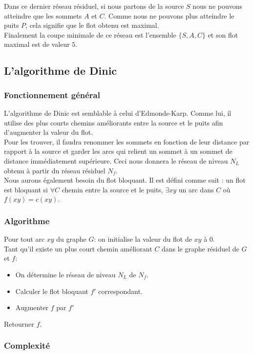 \documentclass[a4paper]{article}
\begin{document}
Dans ce dernier réseau résiduel, si nous partons de la source $S$ nous ne pouvons atteindre que les sommets $A$ et $C$. Comme nous ne pouvons plus atteindre le puits $P$, cela signifie que le flot obtenu est maximal.\\
Finalement la coupe minimale de ce réseau est l'ensemble $\{S,A,C\}$ et son flot maximal est de valeur $5$.\\

\subsection{L'algorithme de Dinic}

\subsubsection{Fonctionnement général}
L'algorithme de Dinic est semblable à celui d'Edmonds-Karp. Comme lui, il utilise des plus courts chemins améliorants entre la source et le puits afin d'augmenter la valeur du flot. \\Pour les trouver, il faudra renommer les sommets en fonction de leur distance par rapport à la source et garder les arcs qui relient un sommet à un sommet de distance immédiatement supérieure. Ceci nous donnera le réseau de niveau $N_L$ obtenu à partir du réseau résiduel $N_f$.\\
Nous aurons également besoin du flot bloquant. Il est défini comme suit : un flot est bloquant si $\forall C$ chemin entre la source et le puits, $\exists xy$ un arc dans $C$ où $f(xy)=c(xy)$.\\

\subsubsection{Algorithme}
Pour tout arc $xy$ du graphe $G$: on initialise la valeur du flot de $xy$ à $0$.\\
Tant qu'il existe un plus court chemin améliorant $C$ dans le graphe résiduel de $G$ et $f$:
\begin{itemize}
    \item 
	On détermine le réseau de niveau $N_L$ de $N_f$.
    \item
    Calculer le flot bloquant $f'$ correspondant.
    \item 
    Augmenter $f$ par $f'$
\end{itemize}
Retourner $f$.\\

\subsubsection{Complexité}
\end{document}
